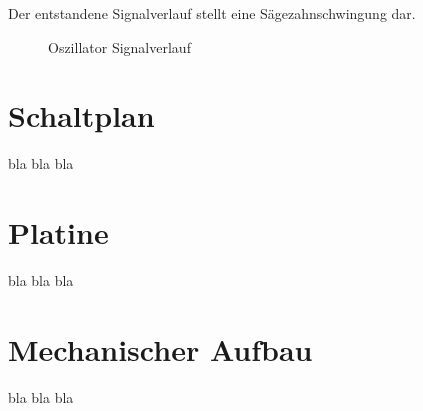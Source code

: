 \newpage 
Der entstandene Signalverlauf stellt eine  Sägezahnschwingung dar.

\begin{figure}[htbp]
	\centering
	\setlength{\fboxsep}{1pt} %
	\setlength{\fboxrule}{1pt} %
	\caption{Oszillator Signalverlauf}
	\label{fig:fig:Oszillator_Signalverlauf}
\end{figure}

\section{Schaltplan}
bla bla bla

\section{Platine}
bla bla bla

\section{Mechanischer Aufbau}
bla bla bla